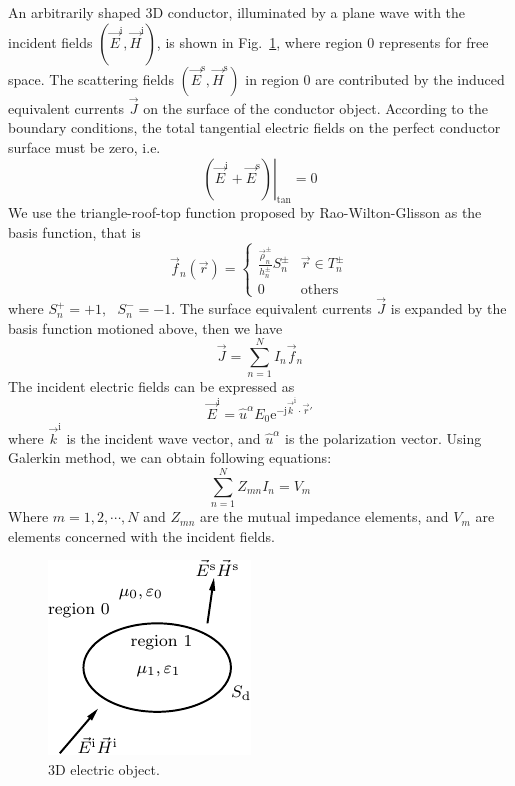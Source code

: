 \documentclass[conference, a4paper]{IEEEtran}
\begin{document}
An arbitrarily shaped 3D conductor, illuminated by a plane wave with the 
incident fields 
$(\vec{E}^\mathrm{i}, \vec{H}^\mathrm{i})$\cite{mittr73}, is shown in Fig.~\ref{fig1}, where region 0 represents for free space. The 
scattering fields $(\vec{E}^\mathrm{s}, \vec{H}^\mathrm{s})$
 in region 0 are contributed by the induced equivalent currents 
$\vec{J}$ on the surface of the conductor object. According to the boundary 
conditions, the total tangential electric fields on the perfect conductor 
surface must be zero, i.e.
\begin{equation}
\left. {\left( \vec{E}^\mathrm{i} + \vec{E}^\mathrm{s}
 \right)} \right|_{\tan } =0
\end{equation}
We use the triangle-roof-top function proposed by
Rao-Wilton-Glisson as the basis function\cite{rao_electromagnetic_scattering_by_1982}, that is
\begin{equation}
\vec{f}_n(\vec{r})=\begin{cases}
\frac{\vec{\rho}_n^{\pm}}{h_n^{\pm}}S_n^{\pm}&\vec{r}\in T_n^{\pm}\\
0&\text{others}
\end{cases}
\end{equation}
where $S_n^+ =+1,\mbox{ }S_n^- =-1$. The surface equivalent currents 
$\vec{J}$ is expanded by the basis function motioned above, then we have
\begin{equation}
\vec{J} =\sum\limits_{n=1}^N {I_n } \vec{f}_n 
\end{equation}
The incident electric fields can be expressed as
\begin{equation}
\vec{E}^\mathrm{i}=\hat {u}^\alpha E_0 
\mathrm{e}^{-\mathrm{j}\vec{k}^\mathrm{i}\cdot 
\vec{r}'}
\end{equation}
where 
$\vec{k}^\mathrm{i}$ is the incident wave vector, and $\hat {u}^\alpha $ is the 
polarization vector. Using Galerkin method, we can obtain following 
equations:
\begin{equation}
\sum\limits_{n=1}^N {Z_{mn} } I_n =V_m 
\end{equation}
Where $m=1,2,\cdots ,N$ and 
$Z_{mn} $ are the mutual impedance elements, and $V_m $ are elements 
concerned with the incident fields. 
\begin{figure}
\centerline{\includegraphics{fig-0}}
\caption{3D electric object.}
\label{fig1}
\end{figure}
\end{document}
